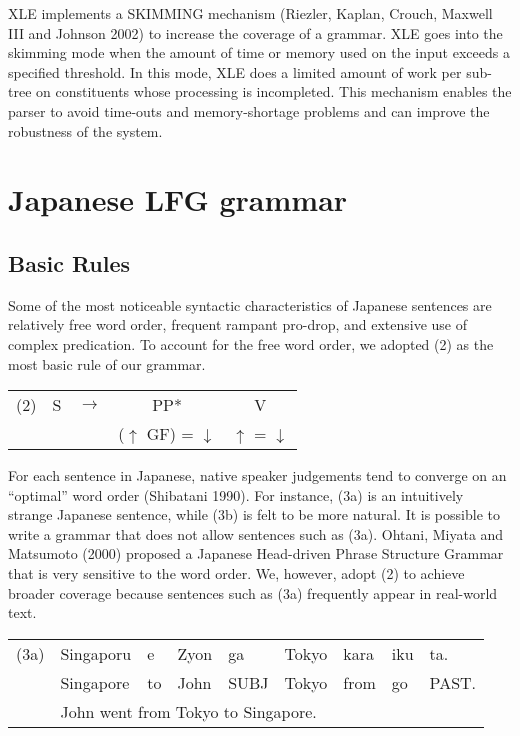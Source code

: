 \documentclass[english]{jnlp_1.4_rep}
\begin{document}
XLE implements a SKIMMING mechanism (Riezler, Kaplan, Crouch, Maxwell III and 
\linebreak
Johnson 2002) to increase
the coverage of a grammar.  XLE goes into the skimming mode when the
amount of time or memory used on the input exceeds a specified
threshold.  In this mode, XLE does a limited amount of work per
sub-tree on constituents whose processing is incompleted.
This mechanism enables the parser to avoid time-outs and
memory-shortage problems and can improve the robustness of the system.


\section{Japanese LFG grammar}
\label{Grammar}

\subsection{Basic Rules}\label{Basic}

Some of the most noticeable syntactic characteristics of Japanese
sentences are relatively free word order, frequent rampant pro-drop,
and extensive use of complex predication.  To account for the free
word order, we adopted (2) as the most basic rule of our grammar.

\vspace{2pt}
\noindent
\begin{tabular}{lllc@{}c}
(2) & S & $\longrightarrow$ & PP* & V\\
    &   &                   & ($\uparrow$ GF) = $\downarrow$ & $\uparrow$ = $\downarrow$
\end{tabular}
\vspace{4pt}

For each sentence in Japanese, native speaker judgements tend to
converge on an ``optimal'' word order (Shibatani 1990).  For instance,
(3a) is an intuitively strange Japanese sentence, while (3b) is felt
to be more natural.  It is possible to write a grammar that does not
allow sentences such as (3a).  Ohtani, Miyata and Matsumoto (2000) proposed a
Japanese Head-driven Phrase Structure Grammar that is very sensitive
to the word order.  We, however, adopt (2) to achieve broader coverage
because sentences such as (3a) frequently appear in real-world text.

\vspace{2pt}
\noindent
\begin{tabular}{ll@{ }l@{ }l@{ }l@{ }l@{ }l@{ }l@{ }l}
(3a)& Singaporu&e&Zyon&ga&Tokyo&kara&iku&ta.\\
    & Singapore&to&John&SUBJ&Tokyo&from&go&PAST.\\
    & \multicolumn{8}{l}{\quad John went from Tokyo to Singapore.}
\end{tabular}
\end{document}
